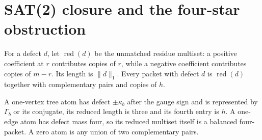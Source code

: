 \section{SAT(2) closure and the four-star obstruction}
For a defect \(d\), let \(\operatorname{red}(d)\) be the unmatched residue multiset: a positive coefficient at \(r\) contributes copies of \(r\), while a negative coefficient contributes copies of \(m-r\). Its length is \(\|d\|_1\). Every packet with defect \(d\) is \(\operatorname{red}(d)\) together with complementary pairs and copies of \(h\).

A one-vertex tree atom has defect \(\pm\kappa_b\) after the gauge sign and is represented by \(\Gamma_b\) or its conjugate, its reduced length is three and its fourth entry is \(h\). A one-edge atom has defect mass four, so its reduced multiset itself is a balanced four-packet. A zero atom is any union of two complementary pairs.

